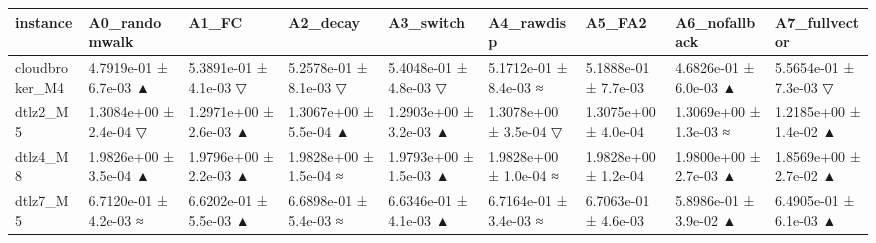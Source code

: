 \begin{tabular}{lllllllll}
\toprule
instance & A0\_randomwalk & A1\_FC & A2\_decay & A3\_switch & A4\_rawdisp & A5\_FA2 & A6\_nofallback & A7\_fullvector \\
\midrule
cloudbroker\_M4 & 4.7919e-01 ± 6.7e-03 ▲ & 5.3891e-01 ± 4.1e-03 ▽ & 5.2578e-01 ± 8.1e-03 ▽ & 5.4048e-01 ± 4.8e-03 ▽ & 5.1712e-01 ± 8.4e-03 ≈ & 5.1888e-01 ± 7.7e-03 & 4.6826e-01 ± 6.0e-03 ▲ & 5.5654e-01 ± 7.3e-03 ▽ \\
dtlz2\_M5 & 1.3084e+00 ± 2.4e-04 ▽ & 1.2971e+00 ± 2.6e-03 ▲ & 1.3067e+00 ± 5.5e-04 ▲ & 1.2903e+00 ± 3.2e-03 ▲ & 1.3078e+00 ± 3.5e-04 ▽ & 1.3075e+00 ± 4.0e-04 & 1.3069e+00 ± 1.3e-03 ≈ & 1.2185e+00 ± 1.4e-02 ▲ \\
dtlz4\_M8 & 1.9826e+00 ± 3.5e-04 ▲ & 1.9796e+00 ± 2.2e-03 ▲ & 1.9828e+00 ± 1.5e-04 ≈ & 1.9793e+00 ± 1.5e-03 ▲ & 1.9828e+00 ± 1.0e-04 ≈ & 1.9828e+00 ± 1.2e-04 & 1.9800e+00 ± 2.7e-03 ▲ & 1.8569e+00 ± 2.7e-02 ▲ \\
dtlz7\_M5 & 6.7120e-01 ± 4.2e-03 ≈ & 6.6202e-01 ± 5.5e-03 ▲ & 6.6898e-01 ± 5.4e-03 ≈ & 6.6346e-01 ± 4.1e-03 ▲ & 6.7164e-01 ± 3.4e-03 ≈ & 6.7063e-01 ± 4.6e-03 & 5.8986e-01 ± 3.9e-02 ▲ & 6.4905e-01 ± 6.1e-03 ▲ \\
\bottomrule
\end{tabular}
